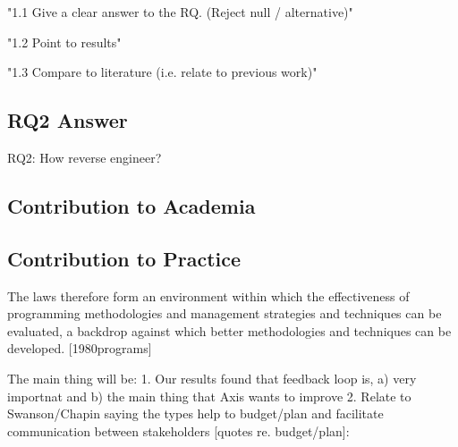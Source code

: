 \documentclass{sig-alternate}
\begin{document}
"1.1 Give a clear answer to the RQ. (Reject null / alternative)"

"1.2 Point to results"

"1.3 Compare to literature (i.e. relate to previous work)"













\subsection{RQ2 Answer}
RQ2: How reverse engineer?





















\subsection{Contribution to Academia} 



\subsection{Contribution to Practice}
The laws therefore form an environment within which the effectiveness of programming methodologies and management strategies and techniques can be evaluated, a backdrop against which better methodologies and techniques can be developed. [1980programs]

The main thing will be:
1. Our results found that feedback loop is, a) very importnat and b) the main thing that Axis wants to improve
2. Relate to Swanson/Chapin saying the types help to budget/plan and facilitate communication between stakeholders
       [quotes re. budget/plan]:
\end{document}
